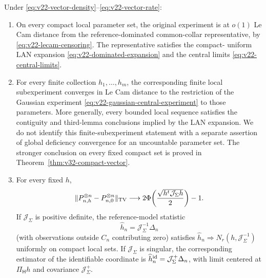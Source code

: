\begin{theorem}
\label{thm:v22-vector-boundary-gaussian}
Under \eqref{eq:v22-vector-density}--\eqref{eq:v22-vector-rate}:

\begin{enumerate}
\item On every compact local parameter set, the original experiment is at
$o(1)$ Le Cam distance from the reference-dominated common-collar representative, by
\eqref{eq:v22-lecam-censoring}.  The representative satisfies the compact-
uniform LAN expansion \eqref{eq:v22-dominated-expansion} and the central
limits \eqref{eq:v22-central-limits}.

\item For every finite collection $h_1,\ldots,h_m$, the corresponding finite
local subexperiment converges in Le Cam distance to the restriction of the
Gaussian experiment \eqref{eq:v22-gaussian-central-experiment} to those
parameters.  More generally, every bounded local sequence satisfies the
contiguity and third-lemma conclusions implied by the LAN expansion.  We do
not identify this finite-subexperiment statement with a separate assertion
of global deficiency convergence for an uncountable parameter set.
The stronger conclusion on every fixed compact set is proved in
Theorem~\ref{thm:v32-compact-vector}.

\item For every fixed $h$,
\begin{equation}\label{eq:v22-testing-profile}
 \|P_{n,h}^{\otimes n}-P_{n,0}^{\otimes n}\|_{\rm TV}
 \longrightarrow
 2\Phi\!\left(\frac{\sqrt{h^t\mathcal J_\Sigma h}}2\right)-1.
\end{equation}
If $\mathcal J_\Sigma$ is positive definite, the reference-model statistic
\begin{equation}\label{eq:v22-local-estimator}
                 \widehat h_n=\mathcal J_\Sigma^{-1}\Delta_n
\end{equation}
(with observations outside $C_n$ contributing zero) satisfies
$\widehat h_n\Rightarrow N_r(h,\mathcal J_\Sigma^{-1})$ uniformly on compact
local sets.  If $\mathcal J_\Sigma$ is singular, the corresponding estimator
of the identifiable coordinate is
$\widehat h_n^{\rm id}=\mathcal J_\Sigma^+\Delta_n$, with limit centered at
$\Pi_{\mathsf H}h$ and covariance $\mathcal J_\Sigma^+$.


\end{enumerate}
\end{theorem}
